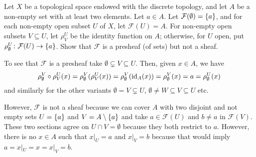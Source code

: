 \begin{exr}
    Let\/ $X$ be a topological space endowed with the discrete topology, and let\/ $A$ be a non-empty set with at least two elements. Let\/ $a\in A$. Let\/ $\mathcal F(\emptyset) = \{a\}$, and for each non-empty open subset\/ $U$ of\/ $X$, let\/ $\mathcal F(U) = A$. For non-empty open subsets\/ $V\subseteq U$, let\/ $\rho^U_V$ be the identity function on\/ $A$; otherwise, for\/ $U$ open, put\/ $\rho_\emptyset^U\colon\mathcal F(U)\to\{a\}$. Show that\/ $\mathcal F$ is a presheaf (of sets) but not a sheaf.
\end{exr}

\begin{solution}
    To see that $\mathcal F$ is a presheaf take $\emptyset\varsubsetneq V\subseteq U$. Then, given $x\in A$, we have
    $$
        \rho^V_\emptyset\circ\rho^U_V(x)=\rho^V_\emptyset(\rho^U_V(x))
            = \rho^V_\emptyset(\text{\rm id}_A(x)) = \rho^V_\emptyset(x)=a
            = \rho^U_\emptyset(x)
    $$
    and similarly for the other variants $\emptyset=V\varsubsetneq U$, $\emptyset\ne W\subseteq V\subseteq U$ etc.

    However, $\mathcal F$ is not a sheaf because we can cover $A$ with two disjoint and not empty sets $U=\{a\}$ and $V=A\setminus\{a\}$ and take $a\in\mathcal F(U)$ and $b\ne a$ in $\mathcal F(V)$. These two sections agree on $U\cap V=\emptyset$ because they both restrict to $a$. However, there is no $x\in A$ such that $x|_U=a$ and $x|_V=b$ because that would imply $a=x|_U=x=x|_V=b$.
\end{solution}